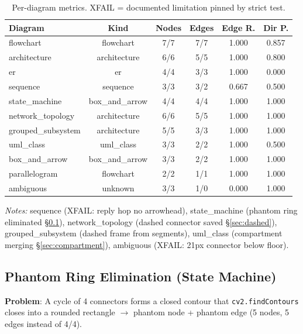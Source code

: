 \documentclass[10pt, conference, compsocconf]{IEEEtran}
\theoremstyle{plain}
\begin{document}
\begin{table}[H]
\centering
\caption{Per-diagram metrics. XFAIL = documented limitation pinned by strict test.}
\label{tab:per-diagram}
\footnotesize
\begin{tabular*}{\columnwidth}{@{\extracolsep{\fill}}lccccc@{}}
\toprule
\textbf{Diagram} & \textbf{Kind} & \textbf{Nodes} & \textbf{Edges} & \textbf{Edge R.} & \textbf{Dir P.} \\
\midrule
flowchart         & flowchart       & 7/7 & 7/7 & 1.000 & 0.857 \\
architecture      & architecture    & 6/6 & 5/5 & 1.000 & 0.800 \\
er                & er              & 4/4 & 3/3 & 1.000 & 0.000 \\
sequence          & sequence        & 3/3 & 3/2 & 0.667 & 0.500 \\
state\_machine    & box\_and\_arrow & 4/4 & 4/4 & 1.000 & 1.000 \\
network\_topology & architecture    & 6/6 & 5/5 & 1.000 & 1.000 \\
grouped\_subsystem& architecture    & 5/5 & 3/3 & 1.000 & 1.000 \\
uml\_class        & uml\_class      & 3/3 & 2/2 & 1.000 & 0.500 \\
box\_and\_arrow    & box\_and\_arrow & 3/3 & 2/2 & 1.000 & 1.000 \\
parallelogram     & flowchart       & 2/2 & 1/1 & 1.000 & 1.000 \\
ambiguous         & unknown         & 3/3 & 1/0 & 0.000 & 1.000 \\
\bottomrule
\end{tabular*}
\end{table}
\smallskip
\noindent\textit{Notes:} sequence (XFAIL: reply hop no arrowhead), state\_machine (phantom ring eliminated \S\ref{sec:phantom}), network\_topology (dashed connector saved \S\ref{sec:dashed}), grouped\_subsystem (dashed frame from segments), uml\_class (compartment merging \S\ref{sec:compartment}), ambiguous (XFAIL: 21px connector below floor).

\subsection{Phantom Ring Elimination (State Machine)}
\label{sec:phantom}

\textbf{Problem}: A cycle of 4 connectors forms a closed contour that \texttt{cv2.findContours} closes into a rounded rectangle $\to$ phantom node + phantom edge (5 nodes, 5 edges instead of 4/4).
\end{document}
